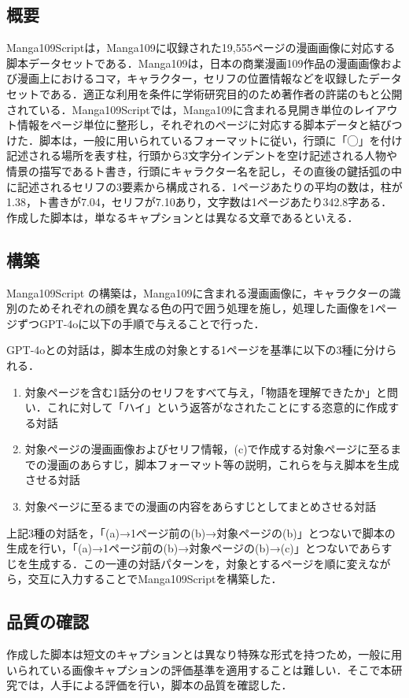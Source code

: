\subsection{概要}
Manga109Scriptは，Manga109に収録された19,555ページの漫画画像に対応する脚本データセットである．Manga109は，日本の商業漫画109作品の漫画画像および漫画上におけるコマ，キャラクター，セリフの位置情報などを収録したデータセットである．適正な利用を条件に学術研究目的のため著作者の許諾のもと公開されている．Manga109Scriptでは，Manga109に含まれる見開き単位のレイアウト情報をページ単位に整形し，それぞれのページに対応する脚本データと結びつけた．脚本は，一般に用いられているフォーマットに従い，行頭に「◯」を付け記述される場所を表す柱，行頭から3文字分インデントを空け記述される人物や情景の描写であるト書き，行頭にキャラクター名を記し，その直後の鍵括弧の中に記述されるセリフの3要素から構成される．1ページあたりの平均の数は，柱が1.38，ト書きが7.04，セリフが7.10あり，文字数は1ページあたり342.8字ある．作成した脚本は，単なるキャプションとは異なる文章であるといえる．

\subsection{構築}
Manga109Script の構築は，Manga109に含まれる漫画画像に，キャラクターの識別のためそれぞれの顔を異なる色の円で囲う処理を施し\cite{visualprompt}，処理した画像を1ページずつGPT-4oに以下の手順で与えることで行った．

GPT-4oとの対話は，脚本生成の対象とする1ページを基準に以下の3種に分けられる．
\begin{enumerate}[label=(\alph*), itemsep=0pt]
      \item 対象ページを含む1話分のセリフをすべて与え，「物語を理解できたか」と問い．これに対して「ハイ」という返答がなされたことにする恣意的に作成する対話
      \item 対象ページの漫画画像およびセリフ情報，(c)で作成する対象ページに至るまでの漫画のあらすじ，脚本フォーマット等の説明，これらを与え脚本を生成させる対話
      \item 対象ページに至るまでの漫画の内容をあらすじとしてまとめさせる対話
\end{enumerate}
上記3種の対話を，「(a)→1ページ前の(b)→対象ページの(b)」とつないで脚本の生成を行い，「(a)→1ページ前の(b)→対象ページの(b)→(c)」とつないであらすじを生成する．この一連の対話パターンを，対象とするページを順に変えながら，交互に入力することでManga109Scriptを構築した．

\subsection{品質の確認}
作成した脚本は短文のキャプションとは異なり特殊な形式を持つため，一般に用いられている画像キャプションの評価基準を適用することは難しい．そこで本研究では，人手による評価を行い，脚本の品質を確認した．

